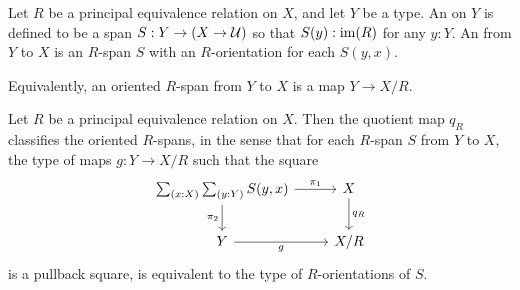 \begin{defn}
Let $R$ be a principal equivalence relation on $X$, and let $Y$ be a type. An  on $Y$ is defined to be a span $S:Y\to (X\to\mathcal{U})$ so that $S(y):\operatorname{im}(R)$ for any $y:Y$. An  from $Y$ to $X$ is an $R$-span $S$ with an $R$-orientation for each $S(y,x)$.
\end{defn}

\begin{rmk}
Equivalently, an oriented $R$-span from $Y$ to $X$ is a map $Y\to X/R$. 
\end{rmk}

\begin{thm}\label{thm:classifying}
Let $R$ be a principal equivalence relation on $X$. Then the quotient map $q_R$
classifies the oriented $R$-spans, in the sense that for each $R$-span $S$ from $Y$ to $X$, the type of maps $g:Y\to X/R$ such that the square
\begin{equation}\label{eq:classifier}
\begin{tikzcd}
\sm{x:X}{y:Y}S(y,x) \arrow[r,"\pi_1"] \arrow[d,swap,"\pi_2"] & X \arrow[d,"q_R"] \\
Y \arrow[r,swap,"g"] & X/R
\end{tikzcd}
\end{equation}
is a pullback square, is equivalent to the type of $R$-orientations of $S$.  
\end{thm}

